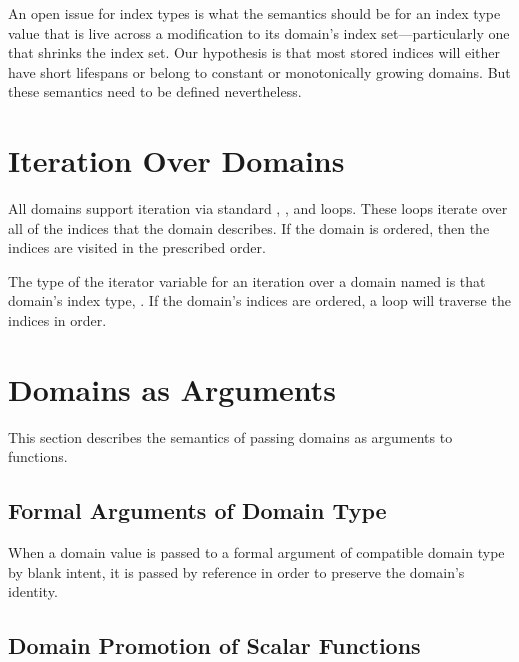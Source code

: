 \begin{openissue}

An open issue for index types is what the semantics should be for an
index type value that is live across a modification to its domain's
index set---particularly one that shrinks the index set.  Our
hypothesis is that most stored indices will either have short
lifespans or belong to constant or monotonically growing domains.  But
these semantics need to be defined nevertheless.

\end{openissue}

\section{Iteration Over Domains}
\label{Iteration_over_Domains}

All domains support iteration via standard , , and 
loops.  These loops iterate over all of the indices that the domain
describes.  If the domain is ordered, then the indices are visited in the
prescribed order.  

The type of the iterator variable for an iteration over a
domain named  is that domain's index type, .
If the domain's indices are ordered, a  loop will traverse the
indices in order.


\section{Domains as Arguments}
\label{Domain_Arguments}

This section describes the semantics of passing domains as arguments
to functions.

\subsection{Formal Arguments of Domain Type}

When a domain value is passed to a formal argument of compatible
domain type by blank intent, it is passed by reference in order to
preserve the domain's identity.

\subsection{Domain Promotion of Scalar Functions}
\label{Domain_Promotion_of_Scalar_Functions}

